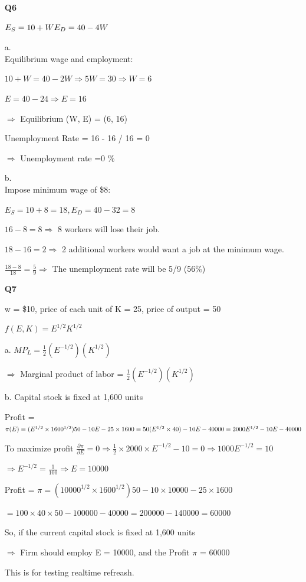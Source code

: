 \documentclass[12pt]{article}
\begin{document}
\begin{enumerate}
    \item[\textbf{Q6}] 

    $E_S = 10 + W\\ E_D = 40 - 4W$

    a.\\ Equilibrium wage and employment:
    
    $10 + W = 40 - 2W \Rightarrow 5W = 30 \Rightarrow W = 6$

    $E = 40 - 24 \Rightarrow E = 16$

    $\Rightarrow$ Equilibrium (W, E) = (6, 16)

    Unemployment Rate = 16 - 16 / 16 = 0 

    $\Rightarrow$ Unemployment rate =0 \%

    b.\\ Impose minimum wage of \$8:

    $E_S = 10 + 8 = 18, E_D = 40 - 32 = 8$

    $16 - 8 = 8 \Rightarrow$ 8 workers will lose their job.

    $18 - 16 = 2 \Rightarrow$ 2 additional workers would want a job at the minimum wage.

    $\frac{18 - 8}{18} = \frac{5}{9} \Rightarrow$ The unemployment rate will be 5/9 (56\%)
    
    \item[\textbf{Q7}]

    w = \$10, price of each unit of K = 25, price of output = 50

    $f(E, K) = E^{1/2}K^{1/2}$

    a. $MP_L = \frac{1}{2}(E^{-1/2})(K^{1/2})$
    
    $\Rightarrow$ Marginal product of labor = $\frac{1}{2}(E^{-1/2})(K^{1/2})$

    b. Capital stock is fixed at 1,600 units

    Profit = $\pi(E) = (E^{1/2} \times 1600^{1/2})50 - 10E - 25 \times 1600 = 50(E^{1/2} \times 40) - 10E - 40000\\ = 2000E^{1/2} - 10E - 40000$
    
    To maximize profit $\frac{\partial \pi}{\partial E} = 0 \Rightarrow \frac{1}{2} \times 2000 \times E^{-1/2} - 10 = 0 \Rightarrow 1000E^{-1/2} = 10$
    
    $\Rightarrow E^{-1/2} = \frac{1}{100} \Rightarrow E = 10000$  

    Profit = $\pi = (10000^{1/2} \times 1600^{1/2})50 - 10 \times 10000 - 25 \times 1600$

    $= 100 \times 40 \times 50 - 100000 - 40000 = 200000 - 140000 = 60000$
    \newline 

    So, if the current capital stock is fixed at 1,600 units
    
    $\Rightarrow$ Firm should employ E = 10000, and the Profit $\pi$ = 60000
    

    This is for testing realtime refreash.
\end{enumerate}
\end{document}
